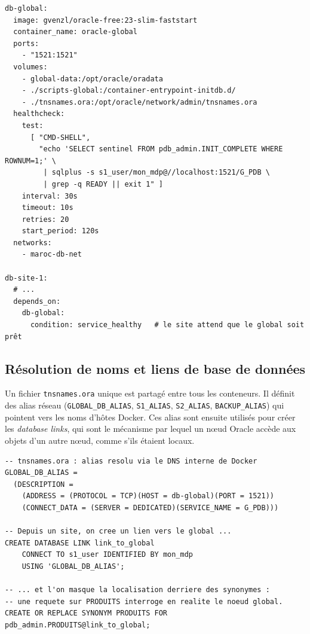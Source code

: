 \documentclass[11pt,a4paper]{article}
\begin{document}
\begin{lstlisting}[style=yaml,caption={Service du nœud global : healthcheck par sentinelle (extrait de \texttt{compose.yaml}).},label={lst:compose}]
db-global:
  image: gvenzl/oracle-free:23-slim-faststart
  container_name: oracle-global
  ports:
    - "1521:1521"
  volumes:
    - global-data:/opt/oracle/oradata
    - ./scripts-global:/container-entrypoint-initdb.d/
    - ./tnsnames.ora:/opt/oracle/network/admin/tnsnames.ora
  healthcheck:
    test:
      [ "CMD-SHELL",
        "echo 'SELECT sentinel FROM pdb_admin.INIT_COMPLETE WHERE ROWNUM=1;' \
         | sqlplus -s s1_user/mon_mdp@//localhost:1521/G_PDB \
         | grep -q READY || exit 1" ]
    interval: 30s
    timeout: 10s
    retries: 20
    start_period: 120s
  networks:
    - maroc-db-net

db-site-1:
  # ...
  depends_on:
    db-global:
      condition: service_healthy   # le site attend que le global soit prêt
\end{lstlisting}

\subsection{Résolution de noms et liens de base de données}

Un fichier \texttt{tnsnames.ora} unique est partagé entre tous les conteneurs.
Il définit des alias réseau (\texttt{GLOBAL\_DB\_ALIAS}, \texttt{S1\_ALIAS},
\texttt{S2\_ALIAS}, \texttt{BACKUP\_ALIAS}) qui pointent vers les noms d'hôtes
Docker. Ces alias sont ensuite utilisés pour créer les \emph{database links},
qui sont le mécanisme par lequel un nœud Oracle accède aux objets d'un autre
nœud, comme s'ils étaient locaux.

\begin{lstlisting}[style=sql,caption={Alias TNS et création d'un lien de base de données.},label={lst:tns}]
-- tnsnames.ora : alias resolu via le DNS interne de Docker
GLOBAL_DB_ALIAS =
  (DESCRIPTION =
    (ADDRESS = (PROTOCOL = TCP)(HOST = db-global)(PORT = 1521))
    (CONNECT_DATA = (SERVER = DEDICATED)(SERVICE_NAME = G_PDB)))

-- Depuis un site, on cree un lien vers le global ...
CREATE DATABASE LINK link_to_global
    CONNECT TO s1_user IDENTIFIED BY mon_mdp
    USING 'GLOBAL_DB_ALIAS';

-- ... et l'on masque la localisation derriere des synonymes :
-- une requete sur PRODUITS interroge en realite le noeud global.
CREATE OR REPLACE SYNONYM PRODUITS FOR pdb_admin.PRODUITS@link_to_global;
\end{lstlisting}
\end{document}
